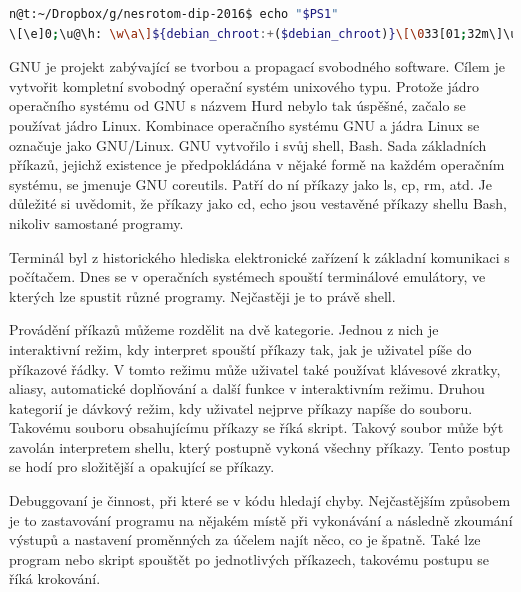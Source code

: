 \documentclass[thesis=M,czech]{FITthesis}[2012/06/26]
\begin{document}
\begin{minipage}{\linewidth}
\begin{lstlisting}[language=bash, caption={Prompt v shellu}, label={lst:prompt}]
n@t:~/Dropbox/g/nesrotom-dip-2016$ echo "$PS1"
\[\e]0;\u@\h: \w\a\]${debian_chroot:+($debian_chroot)}\[\033[01;32m\]\u@\h\[\033[00m\]:\[\033[01;34m\]\w\[\033[00m\]\$
\end{lstlisting}
\end{minipage}



GNU \cite{gnu} je projekt zabývající se tvorbou a propagací svobodného software. Cílem je vytvořit kompletní svobodný operační systém unixového typu. Protože jádro operačního systému od GNU s názvem Hurd \cite{hurd} nebylo tak úspěšné, začalo se používat jádro Linux. Kombinace operačního systému GNU a jádra Linux se označuje jako GNU/Linux. GNU vytvořilo i svůj shell, Bash. Sada základních příkazů, jejichž existence je předpokládána v nějaké formě na každém operačním systému, se jmenuje GNU coreutils. Patří do ní příkazy jako ls, cp, rm, atd. Je důležité si uvědomit, že příkazy jako cd, echo jsou vestavěné příkazy shellu Bash, nikoliv samostané programy.


Terminál byl z historického hlediska elektronické zařízení k základní komunikaci s počítačem. Dnes se v operačních systémech spouští terminálové emulátory, ve kterých lze spustit různé programy. Nejčastěji je to právě shell.


Provádění příkazů můžeme rozdělit na dvě kategorie. Jednou z nich je interaktivní režim, kdy interpret spouští příkazy tak, jak je uživatel píše do příkazové řádky. V tomto režimu může uživatel také používat klávesové zkratky, aliasy, automatické doplňování a další funkce v interaktivním režimu. Druhou kategorií je dávkový režim, kdy uživatel nejprve příkazy napíše do souboru. Takovému souboru obsahujícímu příkazy se říká skript. Takový soubor může být zavolán interpretem shellu, který postupně vykoná všechny příkazy. Tento postup se hodí pro složitější a opakující se příkazy.


Debuggovaní je činnost, při které se v kódu hledají chyby. Nejčastějším způsobem je to zastavování programu na nějakém místě při vykonávání a následně zkoumání výstupů a nastavení proměnných za účelem najít něco, co je špatně. Také lze program nebo skript spouštět po jednotlivých příkazech, takovému postupu se říká krokování.
\end{document}
